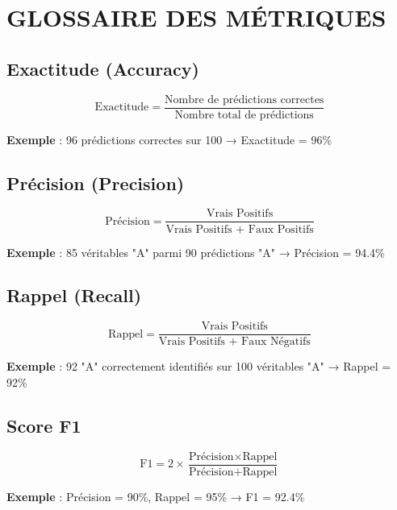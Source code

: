 \documentclass[letterpaper, 10 pt, conference]{ieeeconf}  %
\begin{document}
\section{GLOSSAIRE DES MÉTRIQUES}

\subsection{Exactitude (Accuracy)}

\begin{equation}
\text{Exactitude} = \frac{\text{Nombre de prédictions correctes}}{\text{Nombre total de prédictions}}
\end{equation}

\textbf{Exemple} : 96 prédictions correctes sur 100 → Exactitude = 96\%

\subsection{Précision (Precision)}

\begin{equation}
\text{Précision} = \frac{\text{Vrais Positifs}}{\text{Vrais Positifs + Faux Positifs}}
\end{equation}

\textbf{Exemple} : 85 véritables "A" parmi 90 prédictions "A" → Précision = 94.4\%

\subsection{Rappel (Recall)}

\begin{equation}
\text{Rappel} = \frac{\text{Vrais Positifs}}{\text{Vrais Positifs + Faux Négatifs}}
\end{equation}

\textbf{Exemple} : 92 "A" correctement identifiés sur 100 véritables "A" → Rappel = 92\%

\subsection{Score F1}

\begin{equation}
\text{F1} = 2 \times \frac{\text{Précision} \times \text{Rappel}}{\text{Précision} + \text{Rappel}}
\end{equation}

\textbf{Exemple} : Précision = 90\%, Rappel = 95\% → F1 = 92.4\%
\end{document}

